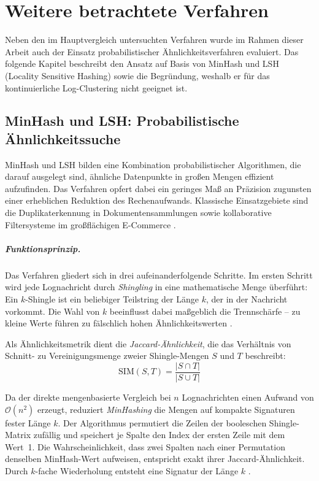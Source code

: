 \chapter{Weitere betrachtete Verfahren}\label{chap:weitere_verfahren}

Neben den im Hauptvergleich untersuchten Verfahren wurde im Rahmen dieser Arbeit
auch der Einsatz probabilistischer Ähnlichkeitsverfahren evaluiert. Das folgende
Kapitel beschreibt den Ansatz auf Basis von MinHash und LSH (Locality Sensitive
Hashing) sowie die Begründung, weshalb er für das kontinuierliche Log-Clustering
nicht geeignet ist.

\section{MinHash und LSH: Probabilistische Ähnlichkeitssuche}\label{sec:minhash_lsh}

MinHash und LSH bilden eine Kombination probabilistischer Algorithmen, die darauf
ausgelegt sind, ähnliche Datenpunkte in großen Mengen effizient aufzufinden. Das
Verfahren opfert dabei ein geringes Maß an Präzision zugunsten einer erheblichen
Reduktion des Rechenaufwands. Klassische Einsatzgebiete sind die
Duplikaterkennung in Dokumentensammlungen sowie kollaborative Filtersysteme im
großflächigen E-Commerce \cite{Leskovec2020_Kap3_1}.

\paragraph{Funktionsprinzip.}
Das Verfahren gliedert sich in drei aufeinanderfolgende Schritte. Im ersten
Schritt wird jede Lognachricht durch \textit{Shingling} in eine mathematische
Menge überführt: Ein $k$-Shingle ist ein beliebiger Teilstring der Länge $k$,
der in der Nachricht vorkommt. Die Wahl von $k$ beeinflusst dabei maßgeblich
die Trennschärfe – zu kleine Werte führen zu fälschlich hohen
Ähnlichkeitswerten \cite{Leskovec2020_Kap3_3_2}.

Als Ähnlichkeitsmetrik dient die \textit{Jaccard-Ähnlichkeit}, die das
Verhältnis von Schnitt- zu Vereinigungsmenge zweier Shingle-Mengen $S$ und $T$
beschreibt:
\begin{equation}
    \mathrm{SIM}(S, T) = \frac{|S \cap T|}{|S \cup T|}
    \label{eq:jaccard}
\end{equation}

Da der direkte mengenbasierte Vergleich bei $n$ Lognachrichten einen Aufwand
von $\mathcal{O}(n^2)$ erzeugt, reduziert \textit{MinHashing} die Mengen auf
kompakte Signaturen fester Länge $k$. Der Algorithmus permutiert die Zeilen
der booleschen Shingle-Matrix zufällig und speichert je Spalte den Index der
ersten Zeile mit dem Wert~1. Die Wahrscheinlichkeit, dass zwei Spalten nach
einer Permutation denselben MinHash-Wert aufweisen, entspricht exakt ihrer
Jaccard-Ähnlichkeit. Durch $k$-fache Wiederholung entsteht eine Signatur der
Länge $k$ \cite{Leskovec2020_Kap3_3}.

